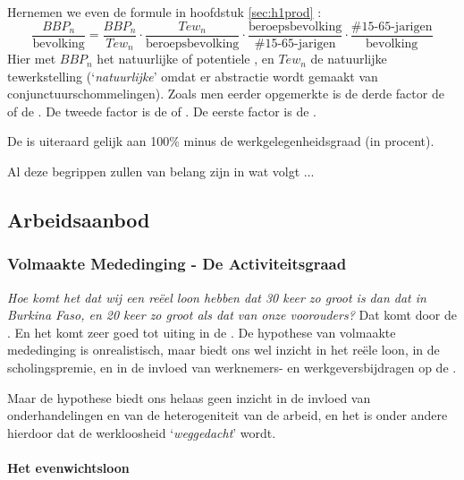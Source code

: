 \par\noindent Hernemen we even de formule in hoofdstuk \ref{sec:h1prod} :
$$\frac{BBP_n}{\text{bevolking}}=\frac{BBP_n}{Tew_n}\cdot\frac{Tew_n}{\text{beroepsbevolking}}\cdot\frac{\text{beroepsbevolking}}{\text{\#15-65-jarigen}}\cdot\frac{\text{\#15-65-jarigen}}{\text{bevolking}}$$
Hier met $BBP_n$ het natuurlijke of potentiele , en $Tew_n$ de natuurlijke tewerkstelling (`\textit{natuurlijke}' omdat er abstractie wordt gemaakt van conjunctuurschommelingen).
Zoals men eerder opgemerkte is de derde factor de  of de . De tweede factor is de  of . De eerste factor is de .
\par De  is uiteraard gelijk aan 100\% minus de werkgelegenheidsgraad (in procent).
\par Al deze begrippen zullen van belang zijn in wat volgt ...\\

\subsection{Arbeidsaanbod}

\subsubsection{Volmaakte Mededinging - De Activiteitsgraad}

\textit{Hoe komt het dat wij een re\"eel loon hebben dat 30 keer zo groot is dan dat in Burkina Faso, en 20 keer zo groot als dat van onze voorouders?}  Dat komt door  de . En het komt zeer goed tot uiting in de . De hypothese van volmaakte mededinging is onrealistisch, maar biedt ons wel inzicht in het re\"ele loon, in de scholingspremie, en in de invloed van werknemers- en werkgeversbijdragen op de .
\par Maar de hypothese biedt ons helaas geen inzicht in de invloed van onderhandelingen en van de heterogeniteit van de arbeid, en het is onder andere hierdoor dat de werkloosheid `\textit{weggedacht}' wordt.

\paragraph{Het evenwichtsloon}

